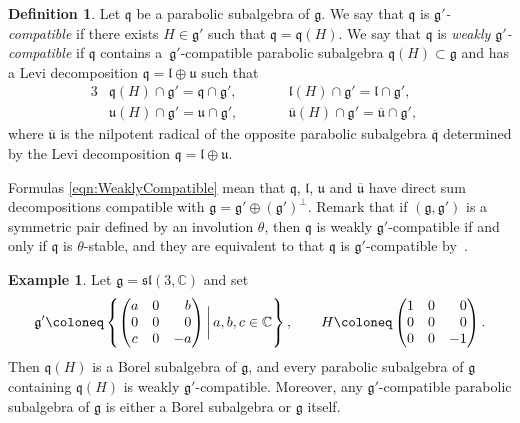 \documentclass[10pt,a4paper]{amsart}
\numberwithin{equation}{section}
\theoremstyle{definition}
\newtheorem{Definition}[Theorem]{Definition}
\newtheorem{Example}[Theorem]{Example}
\newcommand{\set}[1]{\left\{#1 \right\}}
\newcommand{\BasicRing}[1]{\mathbb{#1}}
\newcommand{\CC}{\BasicRing{C}}
\newcommand{\classicalg}[1]{\mathfrak{#1}}
\newcommand{\lie}[1]{\mathfrak{#1}}
\newcommand{\lieSL}{\classicalg{sl}}
\begin{document}
\begin{Definition}\label{def:WeaklyCompatible}
	Let $\lie{q}$ be a parabolic subalgebra of $\lie{g}$.
	We say that $\lie{q}$ is \emph{$\lie{g'}$-compatible} if there exists $H \in \lie{g'}$ such that $\lie{q} = \lie{q}(H)$.
	We say that $\lie{q}$ is \emph{weakly $\lie{g'}$-compatible} if $\lie{q}$ contains a~$\lie{g'}$-compatible parabolic subalgebra $\lie{q}(H) \subset \lie{g}$ and has a Levi decomposition $\lie{q} = \lie{l} \oplus \lie{u}$ such that
	\begin{alignat}{3}
		&\lie{q}(H) \cap \lie{g'} = \lie{q} \cap \lie{g}', \qquad&& \lie{l}(H)\cap \lie{g'} = \lie{l} \cap \lie{g}',& \nonumber \\
		&\lie{u}(H)\cap \lie{g'} = \lie{u} \cap \lie{g}', \qquad&& \lie{\overline{u}}(H)\cap \lie{g'} = \lie{\overline{u}} \cap \lie{g'},& \label{eqn:WeaklyCompatible}
	\end{alignat}
	where $\lie{\overline{u}}$ is the nilpotent radical of the opposite parabolic subalgebra $\lie{\overline{q}}$ determined by the Levi decomposition $\lie{q} = \lie{l}\oplus \lie{u}$.
\end{Definition}

Formulas \eqref{eqn:WeaklyCompatible} mean that $\lie{q}$, $\lie{l}$, $\lie{u}$ and $\lie{\overline{u}}$ have direct sum decompositions compatible with $\lie{g} = \lie{g'}\oplus (\lie{g'})^\perp$.
Remark that if $(\lie{g}, \lie{g'})$ is a symmetric pair defined by an involution $\theta$,
then $\lie{q}$ is weakly $\lie{g'}$-compatible if and only if $\lie{q}$ is $\theta$-stable,
and they are equivalent to that $\lie{q}$ is $\lie{g'}$-compatible by~\cite[Proposition~4.76]{KnVo95_cohomological_induction}.

\begin{Example}
	Let $\lie{g} = \lieSL(3, \CC)$ and set
	\begin{align*}
		\lie{g'} \coloneq \set{\begin{pmatrix} a & 0 & \hphantom{-}b \\ 0 & 0 & \hphantom{-}0 \\ c & 0 & -a \end{pmatrix} \bigg|\, a, b, c \in \CC}, \qquad H \coloneq \begin{pmatrix} 1 & 0 & \hphantom{-}0 \\ 0 & 0 & \hphantom{-}0 \\ 0 & 0 & -1 \end{pmatrix}.
	\end{align*}
	Then $\lie{q}(H)$ is a Borel subalgebra of $\lie{g}$, and every parabolic subalgebra of $\lie{g}$ containing $\lie{q}(H)$ is weakly $\lie{g'}$-compatible.
	Moreover, any $\lie{g'}$-compatible parabolic subalgebra of $\lie{g}$ is either a Borel subalgebra or $\lie{g}$ itself.
\end{Example}
\end{document}
